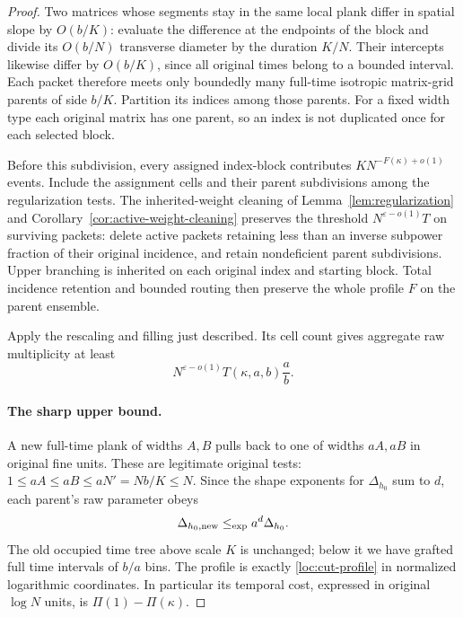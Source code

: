 \begin{proof}
Two matrices whose segments stay in the same local plank differ in
spatial slope by $O(b/K)$: evaluate the difference at the endpoints
of the block and divide its $O(b/N)$ transverse diameter by the
duration $K/N$.  Their intercepts likewise differ by $O(b/K)$,
since all original times belong to a bounded interval.  Each packet
therefore meets only boundedly many full-time isotropic matrix-grid
parents of side $b/K$.  Partition its indices among those parents.
For a fixed width type each original matrix has one parent, so an
index is not duplicated once for each selected block.

Before this subdivision, every assigned index-block contributes
$KN^{-F(\kappa)+o(1)}$ events.  Include the assignment cells and
their parent subdivisions among the regularization tests.  The
inherited-weight cleaning of Lemma~\ref{lem:regularization} and
Corollary~\ref{cor:active-weight-cleaning} preserves the threshold $N^{\varepsilon-o(1)}T$ on surviving
packets: delete active packets retaining less than an inverse
subpower fraction of their original incidence, and retain
nondeficient parent subdivisions.  Upper branching is inherited
on each original index and starting block.  Total incidence
retention and bounded routing then preserve the whole profile
$F$ on the parent ensemble.

Apply the rescaling and filling just described.  Its cell count
gives aggregate raw multiplicity at least
\begin{equation}
 N^{\varepsilon-o(1)}T(\kappa,a,b)\frac{a}{b}.
 \label{loc:isotropic-lower}
\end{equation}

\paragraph{The sharp upper bound.}
A new full-time plank of widths $A,B$ pulls back to one of widths
$aA,aB$ in original fine units.  These are legitimate original tests:
$1\leq aA\leq aB\leq aN'=Nb/K\leq N$.  Since the shape exponents
for $\Delta_{h_0}$ sum to $d$, each parent's raw parameter obeys
\begin{equation}
 \Delta_{h_0,\mathrm{new}}\mathrel{\leq_{\mathrm{exp}}} a^d\Delta_{h_0}.
 \label{loc:isotropic-parameter}
\end{equation}
The old occupied time tree above scale $K$ is unchanged; below it we
have grafted full time intervals of $b/a$ bins.  The profile is exactly
\eqref{loc:cut-profile} in normalized logarithmic coordinates.
In particular its temporal cost, expressed in original $\log N$
units, is $\Pi(1)-\Pi(\kappa)$.


\end{proof}
